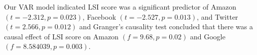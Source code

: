 \documentclass[17pt, a1paper, portrait, margin=0mm, innermargin=1mm,
     blockverticalspace=3mm, colspace=5mm, subcolspace=5mm]{tikzposter} %
\begin{document}
\begin{columns}
{   Our VAR model indicated LSI score was a significant predictor of Amazon
   $(t = -2.312, p = 0.023)$, Facebook $(t = -2.527, p = 0.013)$, and Twitter
   $(t = 2.566, p = 0.012)$ and Granger's causality test concluded that there
   was a causal effect of LSI score on Amazon $(f = 9.68, p = 0.02)$ and
   Google $(f = 8.584039, p = 0.003)$.
   }


 \end{columns}
\end{document}
